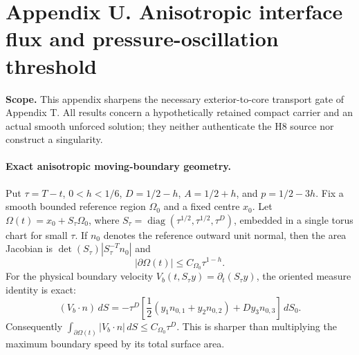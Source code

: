\clearpage
\section*{Appendix U. Anisotropic interface flux and pressure-oscillation threshold}
\noindent\textbf{Scope.} This appendix sharpens the necessary exterior-to-core transport gate of Appendix T. All results concern a hypothetically retained compact carrier and an actual smooth unforced solution; they neither authenticate the H8 source nor construct a singularity.

\paragraph{Exact anisotropic moving-boundary geometry.}
Put $\tau=T-t$, $0<h<1/6$, $D=1/2-h$, $A=1/2+h$, and $p=1/2-3h$. Fix a smooth bounded reference region $\Omega_0$ and a fixed centre $x_0$. Let $\Omega(t)=x_0+S_\tau\Omega_0$, where $S_\tau=\operatorname{diag}(\tau^{1/2},\tau^{1/2},\tau^D)$, embedded in a single torus chart for small $\tau$. If $n_0$ denotes the reference outward unit normal, then the area Jacobian is $\det(S_\tau)|S_\tau^{-T}n_0|$ and
\begin{equation}\label{eq:U-area}
 |\partial\Omega(t)|\le C_{\Omega_0}\tau^{1-h}.
\end{equation}
For the physical boundary velocity $V_b(t,S_\tau y)=\partial_t(S_\tau y)$, the oriented measure identity is exact:
\begin{equation}\label{eq:U-cofactor}
 (V_b\cdot n)\,dS
 =-\tau^D\left[\frac12(y_1n_{0,1}+y_2n_{0,2})+Dy_3n_{0,3}\right]\,dS_0.
\end{equation}
Consequently $\int_{\partial\Omega(t)}|V_b\cdot n|\,dS\le C_{\Omega_0}\tau^D$. This is sharper than multiplying the maximum boundary speed by its total surface area.

